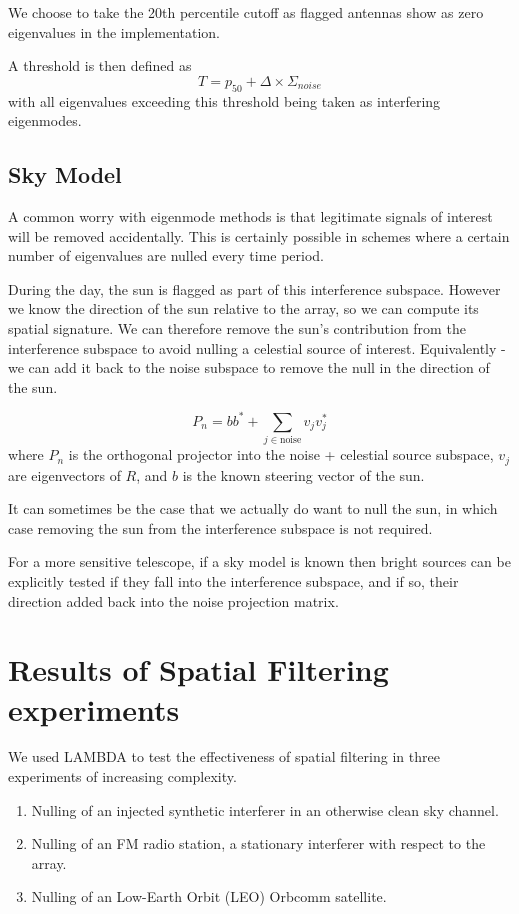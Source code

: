\documentclass{pas}
\begin{document}
We choose to take the 20th percentile cutoff as flagged antennas show as zero eigenvalues in the implementation.

A threshold is then defined as 
\begin{equation}
  T = p_{50} + \Delta \times \Sigma_{noise}
\end{equation}
with all eigenvalues exceeding this threshold being taken as interfering eigenmodes.

\subsection{Sky Model}
A common worry with eigenmode methods is that legitimate signals of interest
will be removed accidentally. This is certainly possible in schemes where
a certain number of eigenvalues are nulled every time period.

During the day, the sun is flagged as part of this interference subspace. However we know the 
direction of the sun relative to the array, so we can compute its spatial signature.
We can therefore remove the sun's contribution from the interference subspace to avoid 
nulling a celestial source of interest.
Equivalently - we can add it back to the noise subspace to remove the null in the direction of the sun.

\begin{equation}
 P_{n} = b b^{*} + \sum_{j \in \text{noise}} v_j v_{j}^{*}
\end{equation}
where $P_{n}$ is the orthogonal projector into the noise + celestial source subspace, $v_{j}$ are 
eigenvectors of $R$, and $b$ is the known steering vector of the sun.


It can sometimes be the case that we actually do want to null the sun, in which case 
removing the sun from the interference subspace is not required.

For a more sensitive telescope, if a sky model is known then bright sources can be explicitly tested 
if they fall into the interference subspace, and if so, their direction added back into the noise projection
matrix.



\section{Results of Spatial Filtering experiments}
We used LAMBDA to test the effectiveness of spatial filtering in three experiments 
of increasing complexity.
\begin{enumerate}
    \item Nulling of an injected synthetic interferer in an otherwise clean sky channel.
    \item Nulling of an FM radio station, a stationary interferer with respect to the array.
    \item Nulling of an Low-Earth Orbit (LEO) Orbcomm satellite.
  \end{enumerate}
\end{document}

